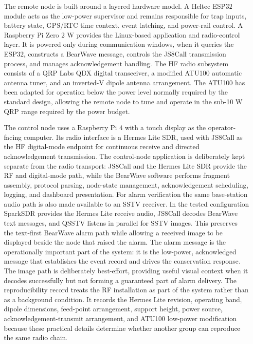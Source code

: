 \documentclass[acmsmall,screen]{acmart}
\begin{document}
The remote node is built around a layered hardware model. A Heltec ESP32 module acts as the low-power supervisor and remains responsible for trap inputs, battery state, GPS/RTC time context, event latching, and power-rail control. A Raspberry Pi Zero 2 W provides the Linux-based application and radio-control layer. It is powered only during communication windows, when it queries the ESP32, constructs a BearWave message, controls the JS8Call transmission process, and manages acknowledgement handling. The HF radio subsystem consists of a QRP Labs QDX digital transceiver, a modified ATU100 automatic antenna tuner, and an inverted-V dipole antenna arrangement. The ATU100 has been adapted for operation below the power level normally required by the standard design, allowing the remote node to tune and operate in the sub-10 W QRP range required by the power budget.

The control node uses a Raspberry Pi 4 with a touch display as the operator-facing computer. Its radio interface is a Hermes Lite SDR, used with JS8Call as the HF digital-mode endpoint for continuous receive and directed acknowledgement transmission. The control-node application is deliberately kept separate from the radio transport: JS8Call and the Hermes Lite SDR provide the RF and digital-mode path, while the BearWave software performs fragment assembly, protocol parsing, node-state management, acknowledgement scheduling, logging, and dashboard presentation.
For alarm verification the same base-station audio path is also made available to an SSTV receiver. In the tested configuration SparkSDR provides the Hermes Lite receive audio, JS8Call decodes BearWave text messages, and QSSTV listens in parallel for SSTV images. This preserves the text-first BearWave alarm path while allowing a received image to be displayed beside the node that raised the alarm. The alarm message is the operationally important part of the system: it is the low-power, acknowledged message that establishes the event record and drives the conservation response. The image path is deliberately best-effort, providing useful visual context when it decodes successfully but not forming a guaranteed part of alarm delivery.
The reproducibility record treats the RF installation as part of the system rather than as a background condition. It records the Hermes Lite revision, operating band, dipole dimensions, feed-point arrangement, support height, power source, acknowledgement-transmit arrangement, and ATU100 low-power modification because these practical details determine whether another group can reproduce the same radio chain.
\end{document}
